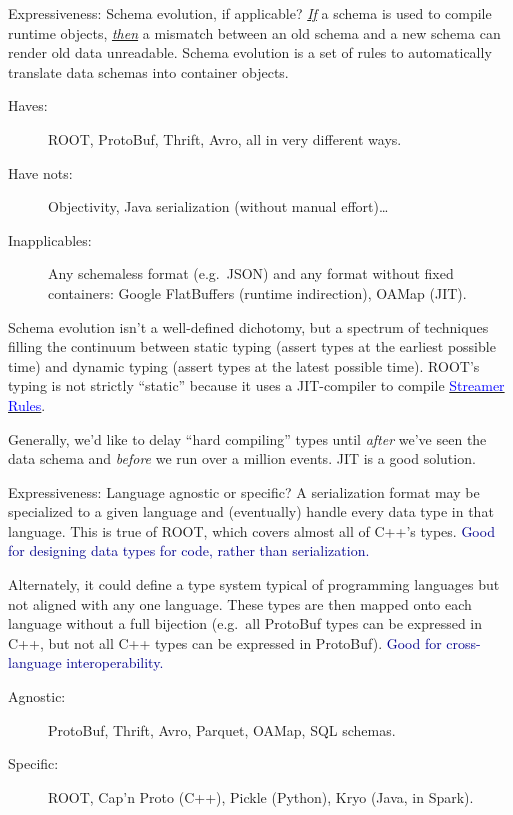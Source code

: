 \documentclass[aspectratio=169]{beamer}
\begin{document}
\begin{frame}{Expressiveness: Schema evolution, if applicable?}
\vspace{0.5 cm}
\underline{\it If} a schema is used to compile runtime objects, \underline{\it then} a mismatch between an old schema and a new schema can render old data unreadable. Schema evolution is a set of rules to automatically translate data schemas into container objects.

\begin{description}
\item[Haves:] ROOT, ProtoBuf, Thrift, Avro, all in very different ways.
\item[Have nots:] Objectivity, Java serialization (without manual effort)\ldots
\item[Inapplicables:] Any schemaless format (e.g.\ JSON) and any format without fixed containers: Google FlatBuffers (runtime indirection), OAMap (JIT).
\end{description}

\vspace{0.25 cm}

Schema evolution isn't a well-defined dichotomy, but a spectrum of techniques filling the continuum between static typing (assert types at the earliest possible time) and dynamic typing (assert types at the latest possible time). ROOT's typing is not strictly ``static'' because it uses a JIT-compiler to compile \href{https://root.cern.ch/root/SchemaEvolution.pdf}{\textcolor{blue}{Streamer Rules}}.

\vspace{0.25 cm}

Generally, we'd like to delay ``hard compiling'' types until {\it after} we've seen the data schema and {\it before} we run over a million events. JIT is a good solution.

\end{frame}

\begin{frame}{Expressiveness: Language agnostic or specific?}
\vspace{0.5 cm}
A serialization format may be specialized to a given language and (eventually) handle every data type in that language. This is true of ROOT, which covers almost all of C++'s types. \textcolor{darkblue}{Good for designing data types for code, rather than serialization.}

\vfill

Alternately, it could define a type system typical of programming languages but not aligned with any one language. These types are then mapped onto each language without a full bijection (e.g.\ all ProtoBuf types can be expressed in C++, but not all C++ types can be expressed in ProtoBuf). \textcolor{darkblue}{Good for cross-language interoperability.}

\vfill

\begin{description}
\item[Agnostic:] ProtoBuf, Thrift, Avro, Parquet, OAMap, SQL schemas.
\item[Specific:] ROOT, Cap'n Proto (C++), Pickle (Python), Kryo (Java, in Spark).
\end{description}
\end{frame}
\end{document}
